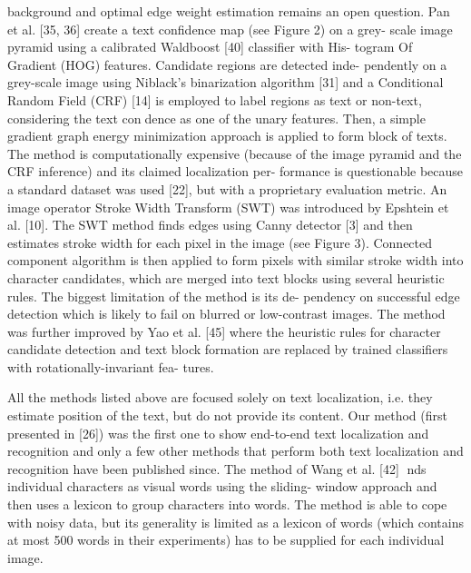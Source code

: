 background and optimal edge weight estimation remains an open question.
Pan et al. [35, 36] create a text confidence map (see Figure 2) on a grey-
scale image pyramid using a calibrated Waldboost [40] classifier with His-
togram Of Gradient (HOG) features. Candidate regions are detected inde-
pendently on a grey-scale image using Niblack's binarization algorithm [31]
and a Conditional Random Field (CRF) [14] is employed to label regions as
text or non-text, considering the text condence as one of the unary features.
Then, a simple gradient graph energy minimization approach is applied to
form block of texts. The method is computationally expensive (because of
the image pyramid and the CRF inference) and its claimed localization per-
formance is questionable because a standard dataset was used [22], but with
a proprietary evaluation metric.
An image operator Stroke Width Transform (SWT) was introduced by
Epshtein et al. [10]. The SWT method finds edges using Canny detector [3]
and then estimates stroke width for each pixel in the image (see Figure 3).
Connected component algorithm is then applied to form pixels with similar
stroke width into character candidates, which are merged into text blocks
using several heuristic rules. The biggest limitation of the method is its de-
pendency on successful edge detection which is likely to fail on blurred or
low-contrast images. The method was further improved by Yao et al. [45]
where the heuristic rules for character candidate detection and text block
formation are replaced by trained classifiers with rotationally-invariant fea-
tures.






All the methods listed above are focused solely on text localization, i.e.
they estimate position of the text, but do not provide its content. Our
method (first presented in [26]) was the first one to show end-to-end text
localization and recognition and only a few other methods that perform both
text localization and recognition have been published since. The method of
Wang et al. [42] nds individual characters as visual words using the sliding-
window approach and then uses a lexicon to group characters into words.
The method is able to cope with noisy data, but its generality is limited as
a lexicon of words (which contains at most 500 words in their experiments)
has to be supplied for each individual image.

